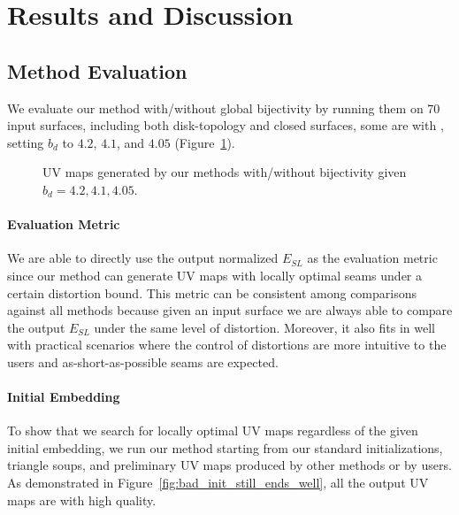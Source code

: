 
\section{Results and Discussion}
\label{sec:results}


\subsection{Method Evaluation}

We evaluate our method with/without global bijectivity by running them on 70 input surfaces, including both disk-topology and closed surfaces, some are with , setting $b_d$ to $4.2$, $4.1$, and $4.05$ (Figure~\ref{fig:our_impressive_results}).

\begin{figure}[!h]
\centering
\caption{UV maps generated by our methods with/without bijectivity given $b_d = 4.2, 4.1, 4.05$.}
\label{fig:our_impressive_results}
\end{figure}

\paragraph{Evaluation Metric}
We are able to directly use the output normalized $E_{SL}$ as the evaluation metric since our method can generate UV maps with locally optimal seams under a certain distortion bound. This metric can be consistent among comparisons against all methods because given an input surface we are always able to compare the output $E_{SL}$ under the same level of distortion. Moreover, it also fits in well with practical scenarios where the control of distortions are more intuitive to the users and as-short-as-possible seams are expected.

\paragraph{Initial Embedding}
 To show that we search for locally optimal UV maps regardless of the given initial embedding, we run our method starting from our standard initializations, triangle soups, and preliminary UV maps produced by other methods or by users. As demonstrated in Figure~\ref{fig:bad_init_still_ends_well}, all the output UV maps are with high quality.


